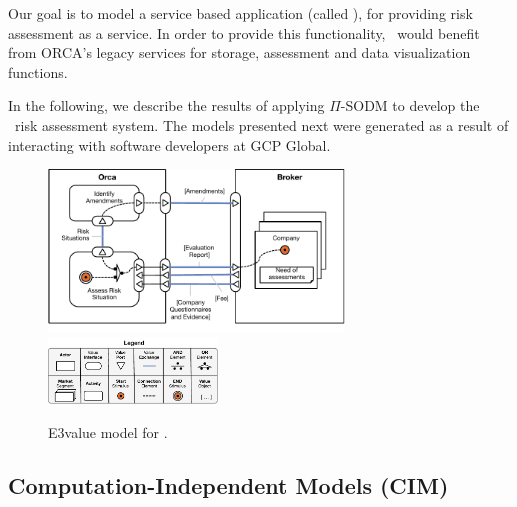 Our goal is to model a service based application (called \FlyingPig), for providing risk assessment as a service.
In order to provide this functionality, \FlyingPig\ would benefit from ORCA's legacy services for storage, assessment and data visualization functions.

In the following, we describe the results of applying $\Pi$-SODM to develop the \FlyingPig\ risk assessment system.
The models presented next were generated as a result of interacting with software developers at GCP Global.

\begin{figure}
\centering
\includegraphics[width=0.7\textwidth]{figs/3ValueModel.pdf}
\hspace*{5cm}\includegraphics[width=0.4\textwidth]{figs/3ValueKey.pdf}
\caption{E3value model for \FlyingPig.\label{fig:E3valuemodel}}
\end{figure}

\subsection{Computation-Independent Models (CIM)}

